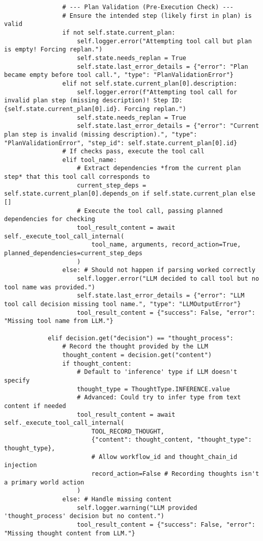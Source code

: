 \documentclass[12pt,a4paper]{article}
\begin{document}
\begin{pageablecode}
\begin{verbatim}
                # --- Plan Validation (Pre-Execution Check) ---
                # Ensure the intended step (likely first in plan) is valid
                if not self.state.current_plan:
                    self.logger.error("Attempting tool call but plan is empty! Forcing replan.")
                    self.state.needs_replan = True
                    self.state.last_error_details = {"error": "Plan became empty before tool call.", "type": "PlanValidationError"}
                elif not self.state.current_plan[0].description:
                    self.logger.error(f"Attempting tool call for invalid plan step (missing description)! Step ID: {self.state.current_plan[0].id}. Forcing replan.")
                    self.state.needs_replan = True
                    self.state.last_error_details = {"error": "Current plan step is invalid (missing description).", "type": "PlanValidationError", "step_id": self.state.current_plan[0].id}
                # If checks pass, execute the tool call
                elif tool_name:
                    # Extract dependencies *from the current plan step* that this tool call corresponds to
                    current_step_deps = self.state.current_plan[0].depends_on if self.state.current_plan else []
                    # Execute the tool call, passing planned dependencies for checking
                    tool_result_content = await self._execute_tool_call_internal(
                        tool_name, arguments, record_action=True, planned_dependencies=current_step_deps
                    )
                else: # Should not happen if parsing worked correctly
                    self.logger.error("LLM decided to call tool but no tool name was provided.")
                    self.state.last_error_details = {"error": "LLM tool call decision missing tool name.", "type": "LLMOutputError"}
                    tool_result_content = {"success": False, "error": "Missing tool name from LLM."}

            elif decision.get("decision") == "thought_process":
                # Record the thought provided by the LLM
                thought_content = decision.get("content")
                if thought_content:
                    # Default to 'inference' type if LLM doesn't specify
                    thought_type = ThoughtType.INFERENCE.value
                    # Advanced: Could try to infer type from text content if needed
                    tool_result_content = await self._execute_tool_call_internal(
                        TOOL_RECORD_THOUGHT,
                        {"content": thought_content, "thought_type": thought_type},
                        # Allow workflow_id and thought_chain_id injection
                        record_action=False # Recording thoughts isn't a primary world action
                    )
                else: # Handle missing content
                    self.logger.warning("LLM provided 'thought_process' decision but no content.")
                    tool_result_content = {"success": False, "error": "Missing thought content from LLM."}


\end{verbatim}
\end{pageablecode}
\end{document}
